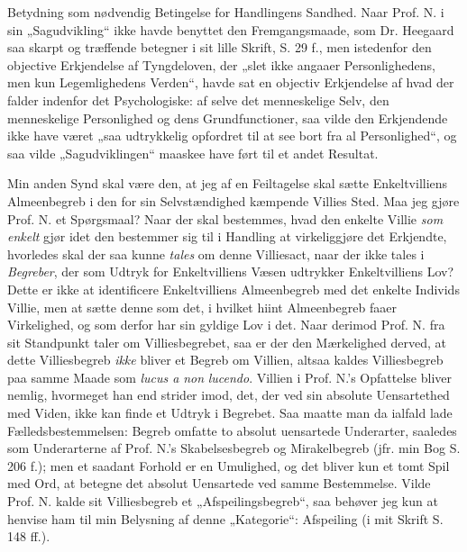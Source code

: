 \documentclass[12pt,a4paper]{book}
\newcommand{\opage}[1]{\marginnote{\footnotesize\textit{[#1]}}}
\begin{document}
Betydning som nødvendig Betingelse for Handlingens Sandhed. Naar Prof. N. i sin
„Sagudvikling“ ikke havde benyttet den Fremgangsmaade, som Dr. Heegaard saa
skarpt og træffende betegner i sit lille Skrift, S. 29 f., men istedenfor den
objective Erkjendelse af Tyngdeloven, der „slet ikke angaaer Personlighedens,
men kun Legemlighedens Verden“, havde sat en objectiv Erkjendelse af hvad der
falder indenfor det Psychologiske: af selve det menneskelige Selv, den
menneskelige Personlighed og dens Grundfunctioner, saa vilde den Erkjendende
ikke have været „saa udtrykkelig opfordret til at see bort fra al
Personlighed“, og saa vilde „Sagudviklingen“ maaskee have ført til et andet
Resultat.

Min anden Synd skal være den, at jeg af en Feiltagelse skal sætte
Enkeltvilliens Almeenbegreb i den for sin Selvstændighed kæmpende Villies Sted.
Maa jeg gjøre Prof.
\opage{12} N. et Spørgsmaal? Naar der skal bestemmes, hvad den enkelte Villie \emph{som
enkelt} gjør idet den bestemmer sig til i Handling at virkeliggjøre det
Erkjendte, hvorledes skal der saa kunne \emph{tales} om denne Villiesact, naar
der ikke tales i \emph{Begreber}, der som Udtryk for Enkeltvilliens Væsen
udtrykker Enkeltvilliens Lov?
Dette er ikke at identificere Enkeltvilliens Almeenbegreb med det enkelte
Individs Villie, men at sætte denne som det, i hvilket hiint Almeenbegreb faaer
Virkelighed, og som derfor har sin gyldige Lov i det. Naar derimod Prof. N. fra
sit Standpunkt taler om Villiesbegrebet, saa er der den Mærkelighed derved, at
dette Villiesbegreb \emph{ikke} bliver et Begreb om Villien, altsaa kaldes
Villiesbegreb paa samme Maade som \textit{lucus a} \emph{\textit{non}}
\textit{lucendo}.
Villien i Prof. N.'s Opfattelse bliver nemlig, hvormeget han end strider imod,
det, der ved sin absolute Uensartethed med Viden, ikke kan finde et Udtryk i
Begrebet. Saa maatte man da ialfald lade Fælledsbestemmelsen: Begreb omfatte to
absolut uensartede Underarter, saaledes som Underarterne af Prof. N.'s
Skabelsesbegreb og Mirakelbegreb (jfr. min Bog S. 206 f.); men et saadant
Forhold er en Umulighed, og det bliver kun et tomt Spil med Ord, at betegne det
absolut Uensartede ved samme Bestemmelse. Vilde Prof. N. kalde sit
Villiesbegreb et „Afspeilingsbegreb“, saa behøver jeg kun at henvise ham til min
Belysning af denne „Kategorie“: Afspeiling (i mit Skrift S. 148 ff.).
\end{document}
